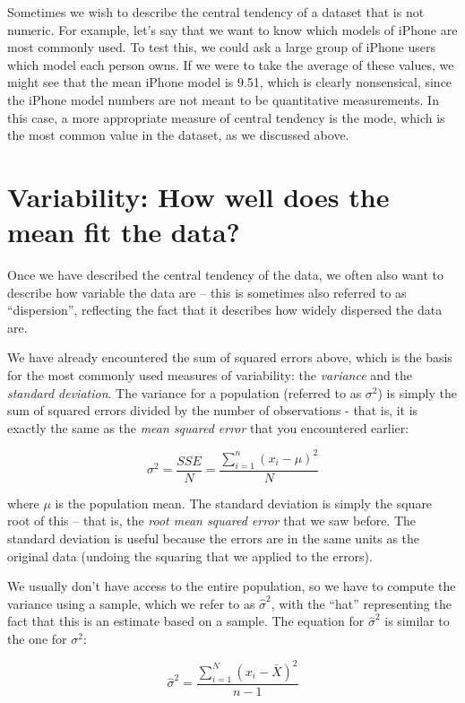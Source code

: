\documentclass[12pt,]{book}
\theoremstyle{definition}
\theoremstyle{definition}
\theoremstyle{definition}
\theoremstyle{remark}
\begin{document}
Sometimes we wish to describe the central tendency of a dataset that is not numeric. For example, let's say that we want to know which models of iPhone are most commonly used. To test this, we could ask a large group of iPhone users which model each person owns. If we were to take the average of these values, we might see that the mean iPhone model is 9.51, which is clearly nonsensical, since the iPhone model numbers are not meant to be quantitative measurements. In this case, a more appropriate measure of central tendency is the mode, which is the most common value in the dataset, as we discussed above.

\hypertarget{variability-how-well-does-the-mean-fit-the-data}{%
\section{Variability: How well does the mean fit the data?}\label{variability-how-well-does-the-mean-fit-the-data}}

Once we have described the central tendency of the data, we often also want to describe how variable the data are -- this is sometimes also referred to as ``dispersion'', reflecting the fact that it describes how widely dispersed the data are.

We have already encountered the sum of squared errors above, which is the basis for the most commonly used measures of variability: the \emph{variance} and the \emph{standard deviation}. The variance for a population (referred to as \(\sigma^2\)) is simply the sum of squared errors divided by the number of observations - that is, it is exactly the same as the \emph{mean squared error} that you encountered earlier:

\[
\sigma^2 = \frac{SSE}{N} = \frac{\sum_{i=1}^n (x_i - \mu)^2}{N}
\]

where \(\mu\) is the population mean. The standard deviation is simply the square root of this -- that is, the \emph{root mean squared error} that we saw before. The standard deviation is useful because the errors are in the same units as the original data (undoing the squaring that we applied to the errors).

We usually don't have access to the entire population, so we have to compute the variance using a sample, which we refer to as \(\hat{\sigma}^2\), with the ``hat'' representing the fact that this is an estimate based on a sample. The equation for \(\hat{\sigma}^2\) is similar to the one for \(\sigma^2\):

\[
\hat{\sigma}^2 = \frac{\sum_{i=1}^N (x_i - \bar{X})^2}{n-1}
\]
\end{document}
